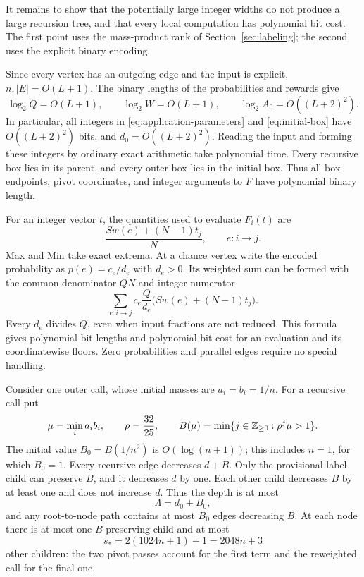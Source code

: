 It remains to show that the potentially large integer widths do not
produce a large recursion tree, and that every local computation has
polynomial bit cost. The first point uses the mass-product rank of
Section~\ref{sec:labeling}; the second uses the explicit binary encoding.

Since every vertex has an outgoing edge and the input is explicit,
$n,|E|=O(L+1)$. The binary lengths of the probabilities and rewards give
\[
 \log_2 Q=O(L+1),\qquad \log_2 W=O(L+1),\qquad
 \log_2 A_0=O((L+2)^2).
\]
In particular, all integers in \eqref{eq:application-parameters} and
\eqref{eq:initial-box} have $O((L+2)^2)$ bits, and
$d_0=O((L+2)^2)$. Reading the input and forming these integers by ordinary
exact arithmetic take polynomial time. Every recursive box lies in its
parent, and every outer box lies in the initial box. Thus all box
endpoints, pivot coordinates, and integer arguments to $F$ have
polynomial binary length.

For an integer vector $t$, the quantities used to evaluate $F_i(t)$ are
\begin{equation}
 \frac{S w(e)+(N-1)t_j}{N},\qquad e:i\longrightarrow j.
 \label{eq:exact-evaluation}
\end{equation}
Max and Min take exact extrema. At a chance vertex write the encoded
probability as $p(e)=c_e/d_e$ with $d_e>0$. Its weighted sum can be
formed with the common denominator $QN$ and integer numerator
\[
 \sum_{e:i\to j}c_e\frac{Q}{d_e}
           \bigl(Sw(e)+(N-1)t_j\bigr).
\]
Every $d_e$ divides $Q$, even when input fractions are not reduced.
This formula gives polynomial bit lengths and polynomial bit cost for
an evaluation and its coordinatewise floors. Zero probabilities and
parallel edges require no special handling.

Consider one outer call, whose initial masses are $a_i=b_i=1/n$.
For a recursive call put
\[
 \mu=\min_i a_i b_i,\qquad \rho=\frac{32}{25},\qquad
 B(\mu)=\min\{j\in\mathbb Z_{\ge0}:\rho^j\mu>1\}.
\]
The initial value $B_0=B(1/n^2)$ is $O(\log(n+1))$; this includes
$n=1$, for which $B_0=1$. Every recursive edge decreases $d+B$.
Only the provisional-label child can preserve $B$, and it decreases
$d$ by one. Each other child decreases $B$ by at least one and does
not increase $d$. Thus the depth is at most
\[
 \Lambda=d_0+B_0,
\]
and any root-to-node path contains at most $B_0$ edges decreasing $B$.
At each node there is at most one $B$-preserving child and at most
\[
 s_*=2(1024n+1)+1=2048n+3
\]
other children: the two pivot passes account for the first term and
the reweighted call for the final one.

